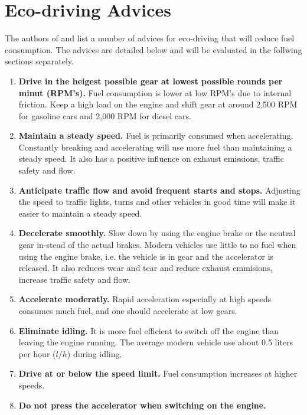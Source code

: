 \section{Eco-driving Advices}\label{ecodriving}
The authors of \cite{EcodrivingAdvice} and \cite{KorGront} list a number of advices for eco-driving that will reduce fuel consumption.
The advices are detailed below and will be evaluated in the follwing sections separately.  

\begin{enumerate}
\item \label{advice.highGearLowRPM} \textbf{Drive in the heigest possible gear at lowest possible rounds per minut (RPM's).}
Fuel consumption is lower at low RPM's due to internal friction. 
Keep a high load on the engine and shift gear at around 2,500 RPM for gasoline cars and 2,000 RPM for diesel cars. 
\item \label{advice.steadySpeed} \textbf{Maintain a steady speed.} 
Fuel is primarily consumed when accelerating.
Constantly breaking and accelerating will use more fuel than maintaining a steady speed.
It also has a positive influence on exhaust emissions, traffic safety and flow.
\item \label{advice.anticipateFlow}\textbf{Anticipate traffic flow and avoid frequent starts and stops.}
Adjusting the speed to traffic lights, turns and other vehicles in good time will make it easier to maintain a steady speed.
\item \label{advice.decelerate}\textbf{Decelerate smoothly.}
Slow down by using the engine brake or the neutral gear in-stead of the actual brakes. 
Modern vehicles use little to no fuel when using the engine brake, i.e. the vehicle is in gear and the accelerator is released. 
It also reduces wear and tear and reduce exhaust emmisions, increase traffic safety and flow.
\item \label{advice.accelerate}\textbf{Accelerate moderatly.}
Rapid acceleration especially at high speeds consumes much fuel, and one should accelerate at low gears.
\item \label{advice.idle}\textbf{Eliminate idling.}
It is more fuel efficient to switch off the engine than leaving the engine running.
The average modern vehicle use about 0.5 liters per hour ($l/h$) during idling.
\item \label{advice.speedLimit}\textbf{Drive at or below the speed limit.}
Fuel consumption increases at higher speeds.
\item \label{advice.startup}\textbf{Do not press the accelerator when switching on the engine.}

\end{enumerate}
